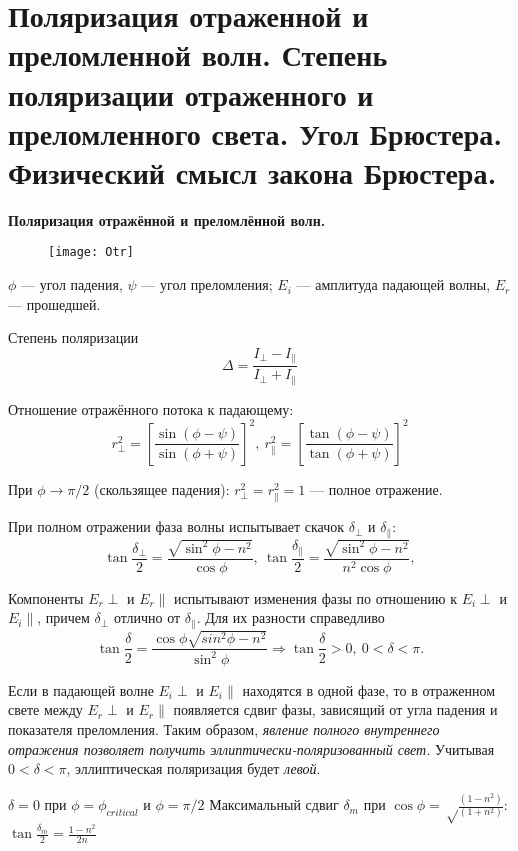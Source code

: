 \section{Поляризация отраженной и преломленной волн. Степень поляризации отраженного и преломленного света. Угол Брюстера. Физический смысл закона Брюстера.}

\textbf{Поляризация отражённой и преломлённой волн.}

	\begin{figure}[H]
	\centering
	\texttt{[image: Otr]}
    \end{figure}

$\phi$ --- угол падения, $\psi$ --- угол преломления;
$E_i$ --- амплитуда падающей волны, $E_r$ --- прошедшей.

Степень поляризации $$\boxed{\Delta = \frac{I_\perp - I_\parallel}{I_\perp + I_\parallel}}$$

Отношение отражённого потока к падающему:
$$r^2_\perp = [\frac{\sin{(\phi - \psi)}}{\sin{(\phi + \psi)}}]^2, \ r^2_\parallel = [\frac{\tan{(\phi - \psi)}}{\tan{(\phi + \psi)}}]^2$$

При $\phi \to \pi/2$ (скользящее падения): $r^2_\perp = r^2_\parallel = 1$ --- полное отражение.

При полном отражении фаза волны испытывает скачок $\delta_\perp$ и $\delta_\parallel$:
$$\tan{\frac{\delta_\perp}{2}} = \frac{\sqrt{\sin^2{\phi}-n^2}}{{\cos{\phi}}}, \ \tan{\frac{\delta_\parallel}{2}} = \frac{\sqrt{\sin^2{\phi}-n^2}}{{n^2\cos{\phi}}},$$
		
		Компоненты $E_r\perp$ и $E_r\parallel$ испытывают изменения фазы по отношению к $E_i\perp$ и $E_i\parallel$, причем $\delta_\perp$ отлично от $\delta_\parallel$. Для их разности справедливо $$\tan{\frac \delta 2 = \frac {\cos{\phi}\sqrt{sin^2{\phi} - n^2}}{\sin^2{\phi}}} \Rightarrow \tan{\frac \delta 2} > 0, \ 0< \delta< \pi.$$
		
		Если в падающей волне $E_i\perp$ и $E_i\parallel$ находятся в одной фазе, то в отраженном свете между $E_r\perp$ и $E_r\parallel$ появляется сдвиг фазы, зависящий от угла падения и показателя преломления. Таким образом, \textit{явление полного внутреннего отражения позволяет получить эллиптически-поляризованный свет.} Учитывая $0< \delta< \pi$, эллиптическая поляризация будет \textit{левой}.
		
		$\delta = 0$ при $\phi = \phi_{critical}$ и $\phi = \pi/2$ 
		Максимальный сдвиг $\delta_m$ при $\cos\phi = \sqrt \frac {(1 - n^2)}{(1+n^2)}$: $\tan \frac {\delta_m} 2 = \frac{1-n^2}{2n}$
		
